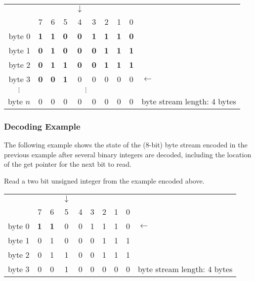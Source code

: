 \documentclass[11pt,letterpaper]{article}
\begin{document}
\begin{tabular}{r|ccccccccl}
\multicolumn{1}{r}{} &&&&$\downarrow$&&&&& \\
         & 7 & 6 & 5 & 4 & 3 & 2 & 1 & 0 &            \\\cline{1-9}
byte 0   & \textbf{1} & \textbf{1} & \textbf{0} & \textbf{0} &
           \textbf{1} & \textbf{1} & \textbf{1} & \textbf{0} & \\
byte 1   & \textbf{0} & \textbf{1} & \textbf{0} & \textbf{0} &
           \textbf{0} & \textbf{1} & \textbf{1} & \textbf{1} & \\
byte 2   & \textbf{0} & \textbf{1} & \textbf{1} & \textbf{0} &
           \textbf{0} & \textbf{1} & \textbf{1} & \textbf{1} & \\
byte 3   & \textbf{0} & \textbf{0} & \textbf{1} &
                       0 & 0 & 0 & 0 & 0 & $\leftarrow$        \\
\multicolumn{1}{c|}{$\vdots$}&\multicolumn{8}{c}{$\vdots$}&    \\
byte $n$ & 0 & 0 & 0 & 0 & 0 & 0 & 0 & 0 &
byte stream length: 4 bytes
\end{tabular}
\vspace{\baselineskip}

\subsubsection{Decoding Example}

The following example shows the state of the (8-bit) byte stream encoded in the
 previous example after several binary integers are decoded, including the
 location of the get pointer for the next bit to read.

Read a two bit unsigned integer from the example encoded above.

\begin{tabular}{r|ccccccccl}
\multicolumn{1}{r}{} &&&$\downarrow$&&&&&&              \\
         & 7 & 6 & 5 & 4 & 3 & 2 & 1 & 0 &              \\\cline{1-9}
byte 0   & \textbf{1} & \textbf{1} & 0 & 0 & 1 & 1 & 1 & 0 & $\leftarrow$ \\
byte 1   & 0 & 1 & 0 & 0 & 0 & 1 & 1 & 1 &              \\
byte 2   & 0 & 1 & 1 & 0 & 0 & 1 & 1 & 1 &              \\
byte 3   & 0 & 0 & 1 & 0 & 0 & 0 & 0 & 0 &
byte stream length: 4 bytes
\end{tabular}
\vspace{\baselineskip}
\end{document}
